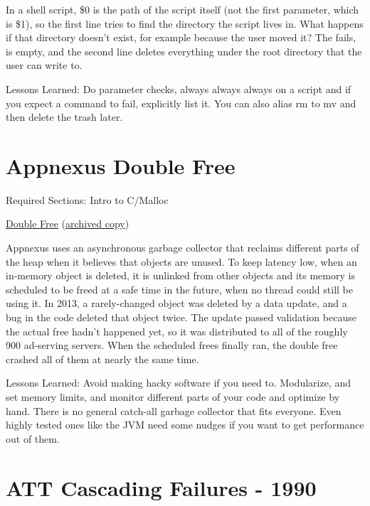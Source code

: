In a shell script, \$0 is the path of the script itself (not the first parameter, which is \$1), so the first line tries to find the directory the script lives in.
What happens if that directory doesn't exist, for example because the user moved it? The  fails,  is empty, and the second line deletes everything under the root directory that the user can write to.

Lessons Learned: Do parameter checks, always always always  on a script and if you expect a command to fail, explicitly list it. You can also alias rm to mv and then delete the trash later.

\section{Appnexus Double Free}
\label{pm:appnexus}

Required Sections: Intro to C/Malloc

\href{https://medium.com/xandr-tech/2013-09-17-outage-postmortem-586b19ae4307}{Double Free} (\href{https://web.archive.org/web/20230303210004/https://medium.com/xandr-tech/2013-09-17-outage-postmortem-586b19ae4307}{archived copy})

Appnexus uses an asynchronous garbage collector that reclaims different parts of the heap when it believes that objects are unused.
To keep latency low, when an in-memory object is deleted, it is unlinked from other objects and its memory is scheduled to be freed at a safe time in the future, when no thread could still be using it.
In 2013, a rarely-changed object was deleted by a data update, and a bug in the code deleted that object twice.
The update passed validation because the actual free hadn't happened yet, so it was distributed to all of the roughly 900 ad-serving servers.
When the scheduled frees finally ran, the double free crashed all of them at nearly the same time.

Lessons Learned: Avoid making hacky software if you need to. Modularize, and set memory limits, and monitor different parts of your code and optimize by hand. There is no general catch-all garbage collector that fits everyone. Even highly tested ones like the JVM need some nudges if you want to get performance out of them.

\section{ATT Cascading Failures - 1990}
\label{pm:att1990}

